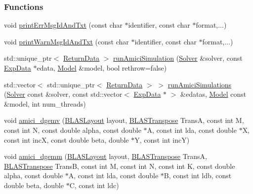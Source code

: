 \subsubsection*{Functions}
\begin{DoxyCompactItemize}
\item 
void \mbox{\hyperlink{namespaceamici_ade28c6a7f1b5aee40bb2453fb61b4024}{print\+Err\+Msg\+Id\+And\+Txt}} (const char $\ast$identifier, const char $\ast$format,...)
\item 
void \mbox{\hyperlink{namespaceamici_a14122f73594a970df27bfcb8fa0db35d}{print\+Warn\+Msg\+Id\+And\+Txt}} (const char $\ast$identifier, const char $\ast$format,...)
\item 
std\+::unique\+\_\+ptr$<$ \mbox{\hyperlink{classamici_1_1_return_data}{Return\+Data}} $>$ \mbox{\hyperlink{namespaceamici_a025192a6f53e19eae958cd3b14786f80}{run\+Amici\+Simulation}} (\mbox{\hyperlink{classamici_1_1_solver}{Solver}} \&solver, const \mbox{\hyperlink{classamici_1_1_exp_data}{Exp\+Data}} $\ast$edata, \mbox{\hyperlink{classamici_1_1_model}{Model}} \&model, bool rethrow=false)
\item 
std\+::vector$<$ std\+::unique\+\_\+ptr$<$ \mbox{\hyperlink{classamici_1_1_return_data}{Return\+Data}} $>$ $>$ \mbox{\hyperlink{namespaceamici_a99419051271016d17c4b743a7869580c}{run\+Amici\+Simulations}} (\mbox{\hyperlink{classamici_1_1_solver}{Solver}} const \&solver, const std\+::vector$<$ \mbox{\hyperlink{classamici_1_1_exp_data}{Exp\+Data}} $\ast$ $>$ \&edatas, \mbox{\hyperlink{classamici_1_1_model}{Model}} const \&model, int num\+\_\+threads)
\item 
void \mbox{\hyperlink{namespaceamici_aaadff5ccb22e546f3590e15f5ee30c1c}{amici\+\_\+dgemv}} (\mbox{\hyperlink{namespaceamici_a3ec6460bb4e7f6100a15d18627a3ff3e}{B\+L\+A\+S\+Layout}} layout, \mbox{\hyperlink{namespaceamici_a0f0ec77c6c8f48d9c5cb50d54899afae}{B\+L\+A\+S\+Transpose}} TransA, const int M, const int N, const double alpha, const double $\ast$A, const int lda, const double $\ast$X, const int incX, const double beta, double $\ast$Y, const int incY)
\item 
void \mbox{\hyperlink{namespaceamici_a235c0cbd2185cc7351ea9c126e498bd9}{amici\+\_\+dgemm}} (\mbox{\hyperlink{namespaceamici_a3ec6460bb4e7f6100a15d18627a3ff3e}{B\+L\+A\+S\+Layout}} layout, \mbox{\hyperlink{namespaceamici_a0f0ec77c6c8f48d9c5cb50d54899afae}{B\+L\+A\+S\+Transpose}} TransA, \mbox{\hyperlink{namespaceamici_a0f0ec77c6c8f48d9c5cb50d54899afae}{B\+L\+A\+S\+Transpose}} TransB, const int M, const int N, const int K, const double alpha, const double $\ast$A, const int lda, const double $\ast$B, const int ldb, const double beta, double $\ast$C, const int ldc)

\end{DoxyCompactItemize}
